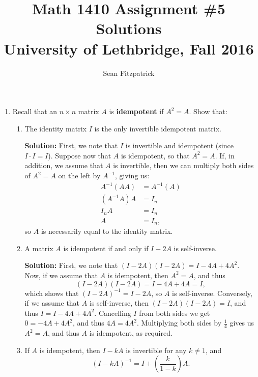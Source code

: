 \documentclass[letterpaper,12pt,reqno]{amsart}
\title{Math 1410 Assignment \#5 Solutions\\University of Lethbridge, Fall 2016}
\author{Sean Fitzpatrick}
\begin{document}
 \maketitle

\begin{enumerate}

\item Recall that an $n\times n$ matrix $A$ is {\bf idempotent} if $A^2=A$. Show that:

\medskip

\begin{enumerate}
 \item The identity matrix $I$ is the only invertible idempotent matrix.

\bigskip

{\bf Solution:} First, we note that $I$ is invertible and idempotent (since $I\cdot I = I$). Suppose now that $A$ is idempotent, so that $A^2=A$. If, in addition, we assume that $A$ is invertible, then we can multiply both sides of $A^2=A$ on the left by $A^{-1}$, giving us:
\begin{align*}
 A^{-1}(AA) &= A^{-1}(A)\\
 (A^{-1}A)A & = I_n\\
 I_nA & = I_n\\
 A & = I_n,
\end{align*}
so $A$ is necessarily equal to the identity matrix.

\bigskip

 \item A matrix $A$ is idempotent if and only if $I-2A$ is self-inverse. 

\bigskip

{\bf Solution:} First, we note that $(I-2A)(I-2A) = I-4A+4A^2$. Now, if we assume that $A$ is idempotent, then $A^2=A$, and thus
\[
 (I-2A)(I-2A) = I-4A+4A = I,
\]
which shows that $(I-2A)^{-1} = I-2A$, so $A$ is self-inverse. Conversely, if we assume that $A$ is self-inverse, then $(I-2A)(I-2A) = I$, and thus $I=I-4A+4A^2$. Cancelling $I$ from both sides we get $0=-4A+4A^2$, and thus $4A=4A^2$. Multiplying both sides by $\frac{1}{4}$ gives us $A^2=A$, and thus $A$ is idempotent, as required.

\bigskip

 \item If $A$ is idempotent, then $I-kA$ is invertible for any $k\neq 1$, and
\[
 (I-kA)^{-1} = I+\left(\frac{k}{1-k}\right)A.
\]

\bigskip


\end{enumerate}
\end{enumerate}
\end{document}
